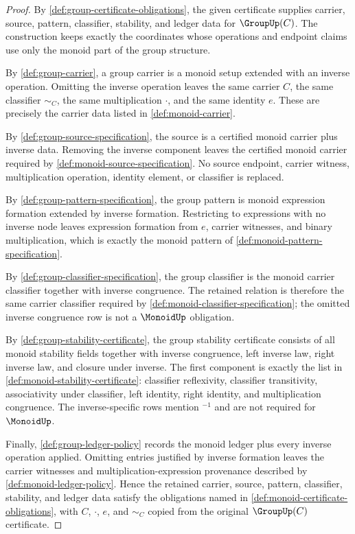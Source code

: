 \begin{proof}
By \autoref{def:group-certificate-obligations}, the given certificate supplies carrier, source, pattern, classifier, stability, and ledger data for $\GroupUp(C)$. The construction keeps exactly the coordinates whose operations and endpoint claims use only the monoid part of the group structure.

By \autoref{def:group-carrier}, a group carrier is a monoid setup extended with an inverse operation. Omitting the inverse operation leaves the same carrier $C$, the same classifier $\sim_C$, the same multiplication $\cdot$, and the same identity $e$. These are precisely the carrier data listed in \autoref{def:monoid-carrier}.

By \autoref{def:group-source-specification}, the source is a certified monoid carrier plus inverse data. Removing the inverse component leaves the certified monoid carrier required by \autoref{def:monoid-source-specification}. No source endpoint, carrier witness, multiplication operation, identity element, or classifier is replaced.

By \autoref{def:group-pattern-specification}, the group pattern is monoid expression formation extended by inverse formation. Restricting to expressions with no inverse node leaves expression formation from $e$, carrier witnesses, and binary multiplication, which is exactly the monoid pattern of \autoref{def:monoid-pattern-specification}.

By \autoref{def:group-classifier-specification}, the group classifier is the monoid carrier classifier together with inverse congruence. The retained relation is therefore the same carrier classifier required by \autoref{def:monoid-classifier-specification}; the omitted inverse congruence row is not a $\MonoidUp$ obligation.

By \autoref{def:group-stability-certificate}, the group stability certificate consists of all monoid stability fields together with inverse congruence, left inverse law, right inverse law, and closure under inverse. The first component is exactly the list in \autoref{def:monoid-stability-certificate}: classifier reflexivity, classifier transitivity, associativity under classifier, left identity, right identity, and multiplication congruence. The inverse-specific rows mention ${}^{-1}$ and are not required for $\MonoidUp$.

Finally, \autoref{def:group-ledger-policy} records the monoid ledger plus every inverse operation applied. Omitting entries justified by inverse formation leaves the carrier witnesses and multiplication-expression provenance described by \autoref{def:monoid-ledger-policy}. Hence the retained carrier, source, pattern, classifier, stability, and ledger data satisfy the obligations named in \autoref{def:monoid-certificate-obligations}, with $C$, $\cdot$, $e$, and $\sim_C$ copied from the original $\GroupUp(C)$ certificate.
\end{proof}

